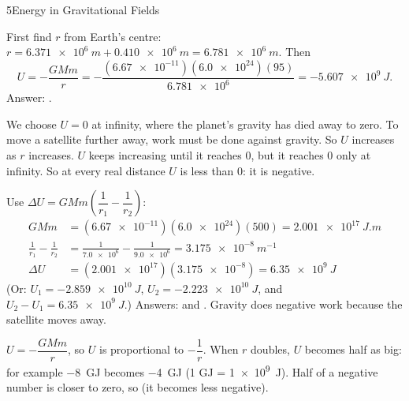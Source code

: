 \begin{chapteranswers}{5}{Energy in Gravitational Fields}
  \item First find $r$ from Earth's centre:
        $r = \qty{6.371e6}{m} + \qty{0.410e6}{m} = \qty{6.781e6}{m}$. Then
        \[ U = -\frac{GMm}{r} = -\frac{(\num{6.67e-11})(\num{6.0e24})(95)}{\num{6.781e6}}
             = \qty{-5.607e9}{J}. \]
        Answer: .
  \item We choose $U = 0$ at infinity, where the planet's gravity has died away
        to zero. To move a satellite further away, work must be done against
        gravity. So $U$ increases as $r$ increases. $U$ keeps increasing until it
        reaches 0, but it reaches 0 only at infinity. So at every real distance
        $U$ is less than 0: it is negative.
        \begin{markingcriteria}
        \end{markingcriteria}
  \item Use $\Delta U = GMm\left(\dfrac{1}{r_1} - \dfrac{1}{r_2}\right)$:
        \begin{align*}
          GMm &= (\num{6.67e-11})(\num{6.0e24})(500) = \qty{2.001e17}{J.m}\\
          \frac{1}{r_1} - \frac{1}{r_2} &= \frac{1}{\num{7.0e6}} - \frac{1}{\num{9.0e6}}
            = \qty{3.175e-8}{m^{-1}}\\
          \Delta U &= (\num{2.001e17})(\num{3.175e-8}) = \qty{6.35e9}{J}
        \end{align*}
        (Or: $U_1 = \qty{-2.859e10}{J}$, $U_2 = \qty{-2.223e10}{J}$, and
        $U_2 - U_1 = \qty{6.35e9}{J}$.)
        Answers:  and
        . Gravity
        does negative work because the satellite moves away.
  \item $U = -\dfrac{GMm}{r}$, so $U$ is proportional to $-\dfrac{1}{r}$. When $r$
        doubles, $U$ becomes half as big: for example \qty{-8}{GJ} becomes
        \qty{-4}{GJ} (1 GJ = \qty{1e9}{J}). Half of a negative number is closer
        to zero, so  (it becomes less negative).

\end{chapteranswers}
